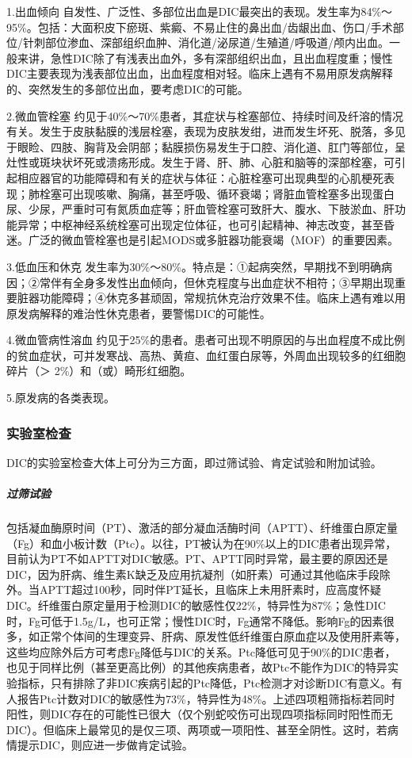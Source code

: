 1.出血倾向
自发性、广泛性、多部位出血是DIC最突出的表现。发生率为84\%～95\%。包括：大面积皮下瘀斑、紫癜、不易止住的鼻出血/齿龈出血、伤口/手术部位/针刺部位渗血、深部组织血肿、消化道/泌尿道/生殖道/呼吸道/颅内出血。一般来讲，急性DIC除了有浅表出血外，多有深部组织出血，且出血程度重；慢性DIC主要表现为浅表部位出血，出血程度相对轻。临床上遇有不易用原发病解释的、突然发生的多部位出血，要考虑DIC的可能。

2.微血管栓塞
约见于40\%～70\%患者，其症状与栓塞部位、持续时间及纤溶的情况有关。发生于皮肤黏膜的浅层栓塞，表现为皮肤发绀，进而发生坏死、脱落，多见于眼睑、四肢、胸背及会阴部；黏膜损伤易发生于口腔、消化道、肛门等部位，呈灶性或斑块状坏死或溃疡形成。发生于肾、肝、肺、心脏和脑等的深部栓塞，可引起相应器官的功能障碍和有关的症状与体征：心脏栓塞可出现典型的心肌梗死表现；肺栓塞可出现咳嗽、胸痛，甚至呼吸、循环衰竭；肾脏血管栓塞多出现蛋白尿、少尿，严重时可有氮质血症等；肝血管栓塞可致肝大、腹水、下肢淤血、肝功能异常；中枢神经系统栓塞可出现定位体征，也可引起精神、神志改变，甚至昏迷。广泛的微血管栓塞也是引起MODS或多脏器功能衰竭（MOF）的重要因素。

3.低血压和休克
发生率为30\%～80\%。特点是：①起病突然，早期找不到明确病因；②常伴有全身多发性出血倾向，但休克程度与出血症状不相符；③早期出现重要脏器功能障碍；④休克多甚顽固，常规抗休克治疗效果不佳。临床上遇有难以用原发病解释的难治性休克患者，要警惕DIC的可能性。

4.微血管病性溶血
约见于25\%的患者。患者可出现不明原因的与出血程度不成比例的贫血症状，可并发寒战、高热、黄疸、血红蛋白尿等，外周血出现较多的红细胞碎片（＞
2\%）和（或）畸形红细胞。

5.原发病的各类表现。

\subsubsection{实验室检查}

DIC的实验室检查大体上可分为三方面，即过筛试验、肯定试验和附加试验。

\subparagraph{过筛试验}

包括凝血酶原时间（PT）、激活的部分凝血活酶时间（APTT）、纤维蛋白原定量（Fg）和血小板计数（Ptc）。以往，PT被认为在90\%以上的DIC患者出现异常，目前认为PT不如APTT对DIC敏感。PT、APTT同时异常，最主要的原因还是DIC，因为肝病、维生素K缺乏及应用抗凝剂（如肝素）可通过其他临床手段除外。当APTT超过100秒，同时伴PT延长，且临床上未用肝素时，应高度怀疑DIC。纤维蛋白原定量用于检测DIC的敏感性仅22\%，特异性为87\%；急性DIC时，Fg可低于1.5g/L，也可正常；慢性DIC时，Fg通常不降低。影响Fg的因素很多，如正常个体间的生理变异、肝病、原发性低纤维蛋白原血症以及使用肝素等，这些均应除外后方可考虑Fg降低与DIC的关系。Ptc降低可见于90\%的DIC患者，也见于同样比例（甚至更高比例）的其他疾病患者，故Ptc不能作为DIC的特异实验指标，只有排除了非DIC疾病引起的Ptc降低，Ptc检测才对诊断DIC有意义。有人报告Ptc计数对DIC的敏感性为73\%，特异性为48\%。上述四项粗筛指标若同时阳性，则DIC存在的可能性已很大（仅个别蛇咬伤可出现四项指标同时阳性而无DIC）。但临床上最常见的是仅三项、两项或一项阳性、甚至全阴性。这时，若病情提示DIC，则应进一步做肯定试验。

